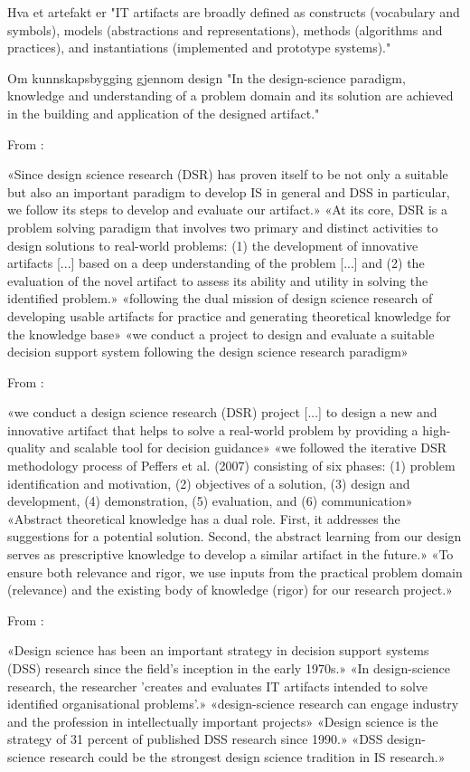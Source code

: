 Hva et artefakt er
"IT artifacts are broadly defined as constructs (vocabulary and symbols), models (abstractions and representations), methods (algorithms and practices), and instantiations (implemented and prototype systems)."

Om kunnskapsbygging gjennom design
"In the design-science paradigm, knowledge and understanding of a problem domain and its solution are achieved in the building and application of the designed artifact."


From \parencite{landwehr2022design_knowledge_deep_learning} :

«Since design science research (DSR) has proven itself to be not only a suitable but also an important paradigm to develop IS in general and DSS in particular, we follow its steps to develop and evaluate our artifact.»
«At its core, DSR is a problem solving paradigm that involves two primary and distinct activities to design solutions to real-world problems: (1) the development of innovative artifacts [...] based on a deep understanding of the problem [...] and (2) the evaluation of the novel artifact to assess its ability and utility in solving the identified problem.»
«following the dual mission of design science research of developing usable artifacts for practice and generating theoretical knowledge for the knowledge base»
«we conduct a project to design and evaluate a suitable decision support system following the design science research paradigm»

From \parencite{dellermann2018design_principles_hybrid_intelligence} :

«we conduct a design science research (DSR) project [...] to design a new and innovative artifact that helps to solve a real-world problem by providing a high-quality and scalable tool for decision guidance»
«we followed the iterative DSR methodology process of Peffers et al. (2007) consisting of six phases: (1) problem identification and motivation, (2) objectives of a solution, (3) design and development, (4) demonstration, (5) evaluation, and (6) communication»
«Abstract theoretical knowledge has a dual role. First, it addresses the suggestions for a potential solution. Second, the abstract learning from our design serves as prescriptive knowledge to develop a similar artifact in the future.»
«To ensure both relevance and rigor, we use inputs from the practical problem domain (relevance) and the existing body of knowledge (rigor) for our research project.»

From \parencite{arnott2012design_science_decision_support_systems_research} :

«Design science has been an important strategy in decision support systems (DSS) research since the field's inception in the early 1970s.»
«In design-science research, the researcher 'creates and evaluates IT artifacts intended to solve identified organisational problems'.»
«design-science research can engage industry and the profession in intellectually important projects»
«Design science is the strategy of 31 percent of published DSS research since 1990.»
«DSS design-science research could be the strongest design science tradition in IS research.»
